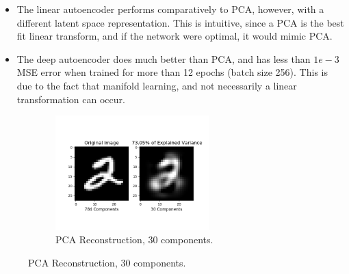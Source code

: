 \begin{itemize}
\item The linear autoencoder performs comparatively to PCA, however, with a different latent space representation. This is intuitive, since a PCA is the best fit linear transform, and if the network were optimal, it would mimic PCA.
\item  The deep autoencoder does much better than PCA, and has less than $1e-3$ MSE error when trained for more than 12 epochs (batch size 256). This is due to the fact that manifold learning, and not necessarily a linear transformation can occur.
\end{itemize}
\begin{figure}[!htbp]
          \begin{subfigure}
          \centering
          \includegraphics[angle=0,width=0.65\textwidth]{assign-4/logs/q1/pca.png}
          \caption{PCA Reconstruction, 30 components.}
          \end{subfigure}
          \end{figure}

